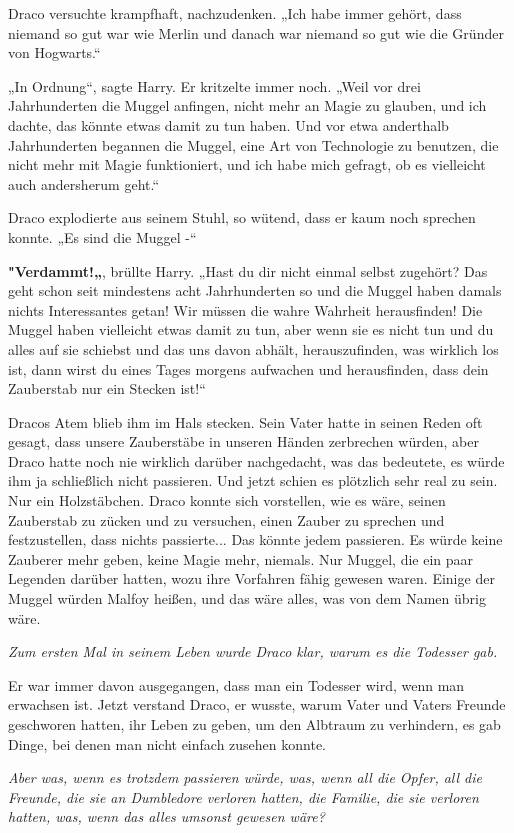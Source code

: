 {Draco versuchte krampfhaft, nachzudenken. „Ich habe immer gehört, dass niemand so gut war wie Merlin und danach war niemand so gut wie die Gründer von Hogwarts.“

„In Ordnung“, sagte Harry. Er kritzelte immer noch. „Weil vor drei Jahrhunderten die Muggel anfingen, nicht mehr an Magie zu glauben, und ich dachte, das könnte etwas damit zu tun haben. Und vor etwa anderthalb Jahrhunderten begannen die Muggel, eine Art von Technologie zu benutzen, die nicht mehr mit Magie funktioniert, und ich habe mich gefragt, ob es vielleicht auch andersherum geht.“

Draco explodierte aus seinem Stuhl, so wütend, dass er kaum noch sprechen konnte. „Es sind die Muggel -“

\textbf{"Verdammt!„}, brüllte Harry. „Hast du dir nicht einmal selbst zugehört? Das geht schon seit mindestens acht Jahrhunderten so und die Muggel haben damals nichts Interessantes getan! Wir müssen die wahre Wahrheit herausfinden! Die Muggel haben vielleicht etwas damit zu tun, aber wenn sie es nicht tun und du alles auf sie schiebst und das uns davon abhält, herauszufinden, was wirklich los ist, dann wirst du eines Tages morgens aufwachen und herausfinden, dass dein Zauberstab nur ein Stecken ist!“

Dracos Atem blieb ihm im Hals stecken. Sein Vater hatte in seinen Reden oft gesagt, dass unsere Zauberstäbe in unseren Händen zerbrechen würden, aber Draco hatte noch nie wirklich darüber nachgedacht, was das bedeutete, es würde ihm ja schließlich nicht passieren. Und jetzt schien es plötzlich sehr real zu sein. Nur ein Holzstäbchen. Draco konnte sich vorstellen, wie es wäre, seinen Zauberstab zu zücken und zu versuchen, einen Zauber zu sprechen und festzustellen, dass nichts passierte... Das könnte jedem passieren. Es würde keine Zauberer mehr geben, keine Magie mehr, niemals. Nur Muggel, die ein paar Legenden darüber hatten, wozu ihre Vorfahren fähig gewesen waren. Einige der Muggel würden Malfoy heißen, und das wäre alles, was von dem Namen übrig wäre.

\emph{Zum ersten Mal in seinem Leben wurde Draco klar, warum es die Todesser gab.}

Er war immer davon ausgegangen, dass man ein Todesser wird, wenn man erwachsen ist. Jetzt verstand Draco, er wusste, warum Vater und Vaters Freunde geschworen hatten, ihr Leben zu geben, um den Albtraum zu verhindern, es gab Dinge, bei denen man nicht einfach zusehen konnte.

\emph{Aber was, wenn es trotzdem passieren würde, was, wenn all die Opfer, all die Freunde, die sie an Dumbledore verloren hatten, die Familie, die sie verloren hatten, was, wenn das alles umsonst gewesen wäre?}

}
